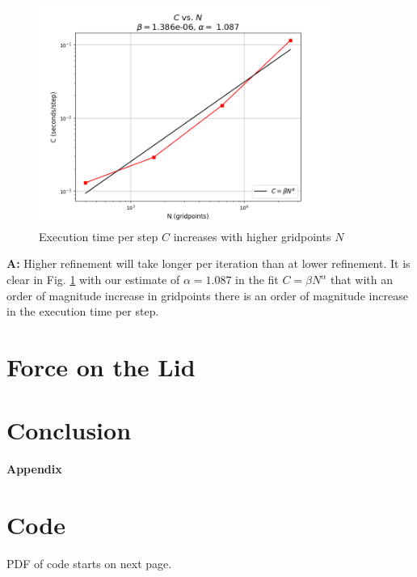 \documentclass[11pt]{article}
\begin{document}
\begin{figure}[H]
   \centering
   \includegraphics[width=0.85\textwidth]{images/Refinement_Measure.png}
   \caption{Execution time per step $C$ increases with higher gridpoints $N$}
   \label{timerefine}
\end{figure}

\begin{center}
\end{center}

\textbf{A:} Higher refinement will take longer per iteration than at lower refinement. It is clear in Fig. \ref{timerefine} with our estimate of $\alpha = 1.087$ in the fit $C = \beta N^{\alpha}$ that with an order of magnitude increase in gridpoints there is an order of magnitude increase in the execution time per step.

\pagebreak

\section{Force on the Lid}

\section{Conclusion}


\pagebreak
\appendix
{} 
\begin{center}
\vspace*{\fill}
   \Huge \bf Appendix 
\vspace*{\fill}
\end{center}
\pagebreak 

\hypertarget{code}{}
\section{Code}
PDF of code starts on next page.
\end{document}

